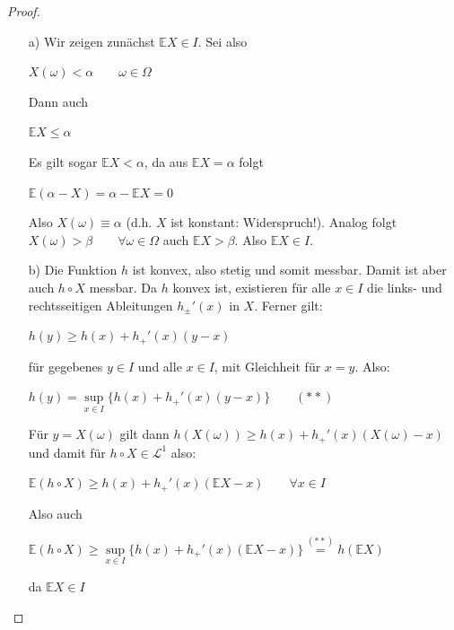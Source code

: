 \documentclass[10pt,a4paper]{report}
\numberwithin{equation}{section}
\numberwithin{figure}{section}
\theoremstyle{plain}
\theoremstyle{definition}
\theoremstyle{remark}
\theoremstyle{plain}
\newcommand{\1}{ \mathbb{1} } %
\begin{document}
\begin{proof} \ 
  \begin{itemize}
  \item[a)] Wir zeigen zunächst $\mathbb{E}X \in I$. Sei also
    \begin{center}
      $X(\omega)< \alpha \qquad \omega \in \Omega$
    \end{center}
    Dann auch
    \begin{center}
      $\mathbb{E}X\leq \alpha$
    \end{center}
    Es gilt sogar $\mathbb{E}X < \alpha$, da aus $\mathbb{E}X=\alpha$
    folgt
    \begin{center}
      $\mathbb{E}(\alpha-X)=\alpha-\mathbb{E}X=0$
    \end{center}
    Also $X(\omega)\equiv \alpha$ (d.h. $X$ ist konstant: Widerspruch!). Analog folgt $X(\omega)>\beta \qquad \forall \omega \in \Omega$ auch $\mathbb{E}X> \beta$. Also $\mathbb{E}X \in I$.
    \item[b)] Die Funktion $h$ ist konvex, also stetig und somit
    messbar. Damit ist aber auch $h\circ X$ messbar. Da $h$ konvex
    ist, existieren für alle $x \in I$ die links- und rechtsseitigen
    Ableitungen $h_\pm'(x)$ in $X$. Ferner gilt:
    \begin{center}
      $h(y)\geq h(x)+h_+'(x)(y-x)$
    \end{center}
    für gegebenes $y \in I$ und alle $x \in I$, mit Gleichheit für
    $x=y$. Also:
    \begin{center}
      $h(y)=\sup\limits_{x \in I}\{h(x)+h_+'(x)(y-x)\} \qquad (**)$
    \end{center}
    Für $y=X(\omega)$ gilt dann $h(X(\omega))\geq h(x)+h_+'(x)(X(\omega)-x)$ und damit für $h\circ X \in \mathcal{L}^1$ also:
    \begin{center}
      $\mathbb{E}(h\circ X) \geq h(x)+h_+'(x)(\mathbb{E}X-x) \qquad
      \forall x \in I$
    \end{center}
    Also auch
    \begin{center}
      $\mathbb{E}(h\circ X)\geq \sup\limits_{x \in
        I}\{h(x)+h_+'(x)(\mathbb{E}X-x)\}\overset{(**)}{=}h(\mathbb{E}X)$
    \end{center}
    da $\mathbb{E}X\in I$
  \end{itemize}
\end{proof}
\end{document}
